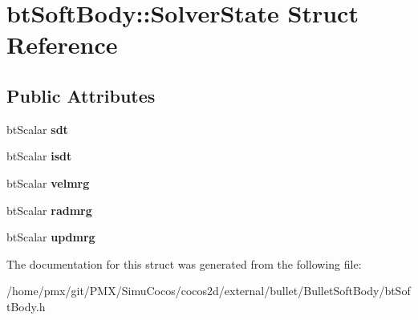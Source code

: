 \hypertarget{structbtSoftBody_1_1SolverState}{}\section{bt\+Soft\+Body\+:\+:Solver\+State Struct Reference}
\label{structbtSoftBody_1_1SolverState}
\subsection*{Public Attributes}
\begin{DoxyCompactItemize}
\item 
\mbox{\label{structbtSoftBody_1_1SolverState_ad0ea3088c28d3c1ca19022b7208fe1d8}} 
bt\+Scalar {\bfseries sdt}
\item 
\mbox{\label{structbtSoftBody_1_1SolverState_a9e8fa89d8f7a168de0dedb36d59945bc}} 
bt\+Scalar {\bfseries isdt}
\item 
\mbox{\label{structbtSoftBody_1_1SolverState_a1c69b78153f16112307397d1df33d67a}} 
bt\+Scalar {\bfseries velmrg}
\item 
\mbox{\label{structbtSoftBody_1_1SolverState_a2cfb8275eeb89b28d79bd63111b3896d}} 
bt\+Scalar {\bfseries radmrg}
\item 
\mbox{\label{structbtSoftBody_1_1SolverState_a9c0af9368af8da8dfe7b94bd9d7542f0}} 
bt\+Scalar {\bfseries updmrg}
\end{DoxyCompactItemize}


The documentation for this struct was generated from the following file\+:\begin{DoxyCompactItemize}
\item 
/home/pmx/git/\+P\+M\+X/\+Simu\+Cocos/cocos2d/external/bullet/\+Bullet\+Soft\+Body/bt\+Soft\+Body.\+h\end{DoxyCompactItemize}
